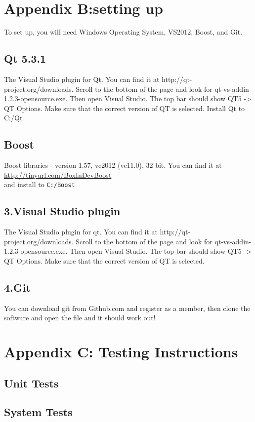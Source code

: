 \documentclass[12pt]{extarticle}
\begin{document}
\section{Appendix B:setting up}
To set up, you will need Windows Operating System, VS2012, Boost, and Git.
\subsection{Qt 5.3.1}
The Visual Studio plugin for Qt. You can find it at http://qt-project.org/downloads. 
Scroll to the bottom of the page and look for qt-vs-addin-1.2.3-opensource.exe. 
Then open Visual Studio. The top bar should show QT5 -> QT Options. Make 
sure that the correct version of QT is selected. 
Install Qt to C:/Qt
\subsection{Boost}
Boost libraries - version 1.57, vc2012 (vc11.0), 32 bit. You can find it at\\
\url{http://tinyurl.com/BoxInDevBoost}\\ and install to \texttt{C:/Boost}
\subsection{3.Visual Studio plugin}
The Visual Studio plugin for qt. You can find it at http://qt-project.org/downloads. 
Scroll to the bottom of the page and look for qt-vs-addin-1.2.3-opensource.exe. 
Then open Visual Studio. The top bar should show QT5 -> QT Options. Make 
sure that the correct version of QT is selected. 
\subsection{4.Git}
You can download git from Github.com and register as a member, then clone the software and open the file and it should work out!

\section{Appendix C: Testing Instructions}
\subsection{Unit Tests}
\subsection{System Tests}
\end{document}
